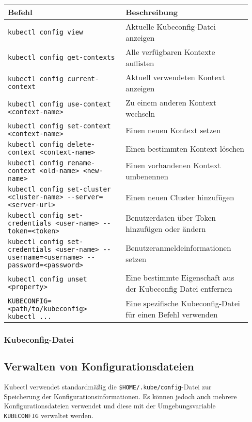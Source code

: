 \noindent
\begin{tabular}{|p{}|p{}|}
\hline
\textbf{Befehl} & \textbf{Beschreibung} \\
\hline
\texttt{kubectl config view} & Aktuelle Kubeconfig-Datei anzeigen \\
\texttt{kubectl config get-contexts} & Alle verfügbaren Kontexte auflisten \\
\texttt{kubectl config current-context} & Aktuell verwendeten Kontext anzeigen \\
\texttt{kubectl config use-context <context-name>} & Zu einem anderen Kontext wechseln \\
\texttt{kubectl config set-context <context-name>} & Einen neuen Kontext setzen \\
\texttt{kubectl config delete-context <context-name>} & Einen bestimmten Kontext löschen \\
\texttt{kubectl config rename-context <old-name> <new-name>} & Einen vorhandenen Kontext umbenennen \\
\texttt{kubectl config set-cluster <cluster-name> {-}{-}server=<server-url>} & Einen neuen Cluster hinzufügen \\
\texttt{kubectl config set-credentials <user-name> {-}{-}token=<token>} & Benutzerdaten über Token hinzufügen oder ändern \\
\texttt{kubectl config set-credentials <user-name> {-}{-}username=<username> {-}{-}password=<password>} & Benutzeranmeldeinformationen setzen \\
\texttt{kubectl config unset <property>} & Eine bestimmte Eigenschaft aus der Kubeconfig-Datei entfernen \\
\texttt{KUBECONFIG=<path/to/kubeconfig> kubectl ...} & Eine spezifische Kubeconfig-Datei für einen Befehl verwenden \\
\hline
\end{tabular}

\subsubsection{Kubeconfig-Datei}

\newpage
\subsection{Verwalten von Konfigurationsdateien}
Kubectl verwendet standardmäßig die \texttt{\$HOME/.kube/config}-Datei zur Speicherung der Konfigurationsinformationen. Es können jedoch auch mehrere Konfigurationsdateien verwendet und diese mit der Umgebungsvariable \texttt{KUBECONFIG} verwaltet werden.

